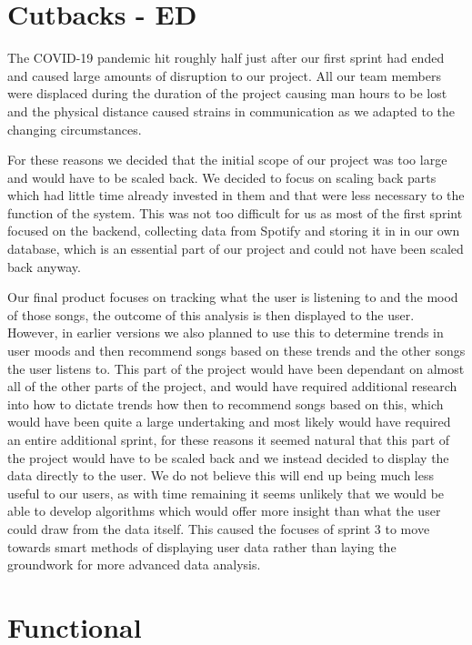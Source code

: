 \documentclass[11pt]{report}
\begin{document}
\section{Cutbacks - ED}

The COVID-19 pandemic hit roughly half just after our first sprint had ended and caused large amounts of disruption to our project. All our team members were displaced during the duration of the project causing man hours to be lost and the physical distance caused strains in communication as we adapted to the changing circumstances.

For these reasons we decided that the initial scope of our project was too large and would have to be scaled back. We decided to focus on scaling back parts which had little time already invested in them and that were less necessary to the function of the system. This was not too difficult for us as most of the first sprint focused on the backend, collecting data from Spotify and storing it in in our own database, which is an essential part of our project and could not have been scaled back anyway.

Our final product focuses on tracking what the user is listening to and the mood of those songs, the outcome of this analysis is then displayed to the user. However, in earlier versions we also planned to use this to determine trends in user moods and then recommend songs based on these trends and the other songs the user listens to. This part of the project would have been dependant on almost all of the other parts of the project, and would have required additional research into how to dictate trends how then to recommend songs based on this, which would have been quite a large undertaking and most likely would have required an entire additional sprint, for these reasons it seemed natural that this part of the project would have to be scaled back and we instead decided to display the data directly to the user. We do not believe this will end up being much less useful to our users, as with time remaining it seems unlikely that we would be able to develop algorithms which would offer more insight than what the user could draw from the data itself. This caused the focuses of sprint 3 to move towards smart methods of displaying user data rather than laying the groundwork for more advanced data analysis.


\section{Functional}
\end{document}
